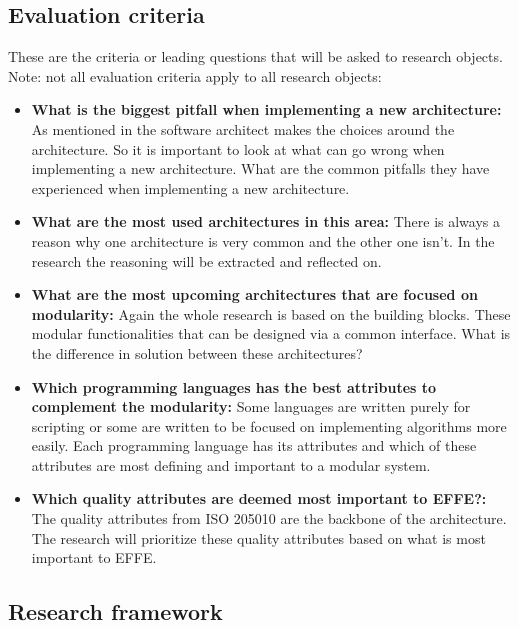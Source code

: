 \subsection{Evaluation criteria}
These are the criteria or leading questions that will be asked to research objects. Note: not all evaluation criteria apply to all research objects:

\begin{itemize}
	\item \textbf{What is the biggest pitfall when implementing a new architecture: }As mentioned in  the software architect makes the choices around the architecture. So it is important to look at what can go wrong when implementing a new architecture. What are the common pitfalls they have experienced when implementing a new architecture.

	\item \textbf{What are the most used architectures in this area: }There is always a reason why one architecture is very common and the other one isn't. In the research the reasoning will be extracted and reflected on.

	\item \textbf{What are the most upcoming architectures that are focused on modularity: }Again the whole research is based on the building blocks. These modular functionalities that can be designed via a common interface. What is the difference in solution between these architectures?

	\item \textbf{Which programming languages has the best attributes to complement the modularity: }Some languages are written purely for scripting or some are written to be focused on implementing algorithms more easily. Each programming language has its attributes and which of these attributes are most defining and important to a modular system.

	\item \textbf{Which quality attributes are deemed most important to EFFE?: }The quality attributes from ISO 205010 \cite{iso25010} are the backbone of the architecture. The research will prioritize these quality attributes based on what is most important to EFFE.
\end{itemize}

\subsection{Research framework}

